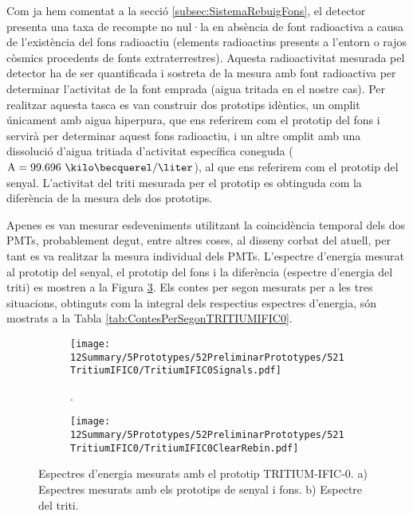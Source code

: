 Com ja hem comentat a la secció \ref{subsec:SistemaRebuigFons}, el detector presenta una taxa de recompte no nul·la en absència de font radioactiva a causa de l'existència del fons radioactiu (elements radioactius presents a l'entorn o rajos còsmics procedents de fonts extraterrestres). Aquesta radioactivitat mesurada pel detector ha de ser quantificada i sostreta de la mesura amb font radioactiva per determinar l'activitat de la font emprada (aigua tritada en el nostre cas). Per realitzar aquesta tasca es van construir dos prototips idèntics, un omplit únicament amb aigua hiperpura, que ens referirem com el prototip del fons i servirà per determinar aquest fons radioactiu, i un altre omplit amb una dissolució d'aigua tritiada d'activitat específica coneguda ($\text{A}=99.696~\kilo\becquerel/\liter$), al que ens referirem com el prototip del senyal. L'activitat del triti mesurada per el prototip es obtinguda com la diferència de la mesura dels dos prototips.

Apenes es van mesurar esdeveniments utilitzant la coincidència temporal dels dos PMTs, probablement degut, entre altres coses, al disseny corbat del atuell, per tant es va realitzar la mesura individual dels PMTs. L'espectre d'energia mesurat al prototip del senyal, el prototip del fons i la diferència (espectre d'energia del triti) es mostren a la Figura \ref{fig:EspectresEnergeticsTritiumIFIC0}. Els contes per segon mesurats per a les tres situacions, obtinguts com la integral dels respectius espectres d'energia, són mostrats a la Tabla \ref{tab:ContesPerSegonTRITIUMIFIC0}. 

\begin{figure}
\centering
    \begin{subfigure}[b]{1\textwidth}
    \centering
    \texttt{[image: 12Summary/5Prototypes/52PreliminarPrototypes/521TritiumIFIC0/TritiumIFIC0Signals.pdf]}  
    \caption{.\label{subfig:EspectreSenyalFonsTritiumIFIC0}}
    \end{subfigure}
    \hfill
    \begin{subfigure}[b]{1\textwidth}
    \centering
    \texttt{[image: 12Summary/5Prototypes/52PreliminarPrototypes/521TritiumIFIC0/TritiumIFIC0ClearRebin.pdf]}  
    \caption{\label{subfig:EspectreTritiTritiumIFIC0}}
    \end{subfigure}
 \caption{Espectres d'energia mesurats amb el prototip TRITIUM-IFIC-0. a) Espectres mesurats amb els prototips de senyal i fons. b) Espectre del triti.}
 \label{fig:EspectresEnergeticsTritiumIFIC0}
\end{figure}

